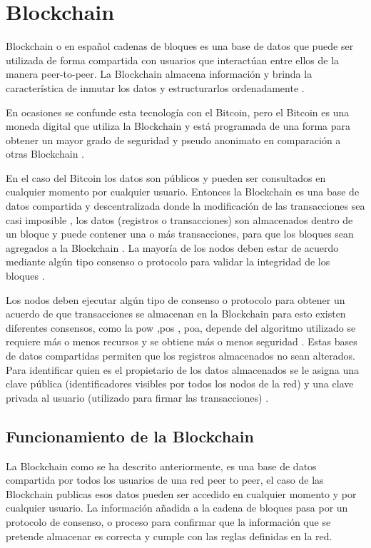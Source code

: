 \section{ Blockchain }
 Blockchain  o en español cadenas de bloques es una base de datos que puede ser utilizada de forma compartida 
con  usuarios que interactúan entre ellos de la manera peer-to-peer. La  Blockchain   almacena información y 
brinda la característica de inmutar los datos y estructurarlos ordenadamente \cite[]{retamal_Blockchain_2017}.

En ocasiones se confunde esta tecnología con el Bitcoin, pero el Bitcoin es una moneda digital que utiliza la   Blockchain  y está 
programada de una forma para obtener un mayor grado de  seguridad y pseudo anonimato en comparación a otras  Blockchain  
\cite[]{choo_Blockchain_2020}.

En el caso del Bitcoin los datos son públicos y pueden ser consultados en cualquier momento por cualquier 
usuario. 
Entonces la  Blockchain  es una base de datos compartida y descentralizada donde la modificación de las 
transacciones sea casi imposible \cite[]{retamal_Blockchain_2017} , los datos (registros o transacciones) son 
almacenados dentro de un bloque y puede contener una o más transacciones, para que los bloques sean agregados a la   Blockchain . 
La mayoría de los nodos deben estar de acuerdo mediante algún tipo consenso o protocolo para validar la integridad de los bloques\cite[]{choo_Blockchain_2020} \cite[]{retamal_Blockchain_2017}.

Los nodos deben ejecutar algún tipo de consenso o protocolo para obtener un acuerdo  de que transacciones se 
almacenan en la  Blockchain  para esto existen diferentes consensos, como la \gls{pow} \cite[]{retamal_Blockchain_2017} ,\gls{pos} \cite[]{drescher_Blockchain_2017}, 
\gls{poa}, depende del algoritmo utilizado se requiere más o menos recursos y se obtiene 
más o menos seguridad \cite[]{retamal_Blockchain_2017}. 
Estas bases de datos compartidas permiten que los registros almacenados no sean alterados. Para identificar 
quien es el propietario de los datos almacenados se le asigna una clave pública (identificadores visibles por
todos los nodos de la red) y una clave privada al usuario (utilizado para firmar las transacciones) 
\cite[]{retamal_Blockchain_2017}.
\subsection{Funcionamiento de la Blockchain}
 La  Blockchain como se ha descrito anteriormente, es una base de datos compartida
 por todos los usuarios de una red peer to peer, el caso de las  Blockchain publicas esos datos
 pueden ser accedido en cualquier momento y por cualquier usuario. 
 La información añadida a la cadena de bloques pasa por un protocolo de consenso,
 o proceso para confirmar que la información que se pretende almacenar es correcta y cumple
 con las reglas definidas en la red.

